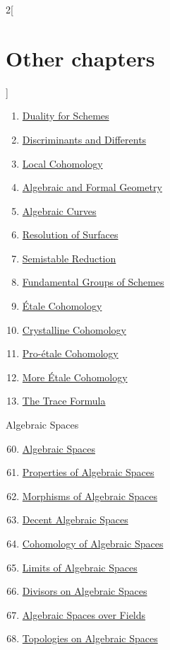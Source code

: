 \begin{multicols}{2}[\section{Other chapters}]
\begin{enumerate}
\item \hyperref[duality-section-phantom]{Duality for Schemes}
\item \hyperref[discriminant-section-phantom]{Discriminants and Differents}
\item \hyperref[local-cohomology-section-phantom]{Local Cohomology}
\item \hyperref[algebraization-section-phantom]{Algebraic and Formal Geometry}
\item \hyperref[curves-section-phantom]{Algebraic Curves}
\item \hyperref[resolve-section-phantom]{Resolution of Surfaces}
\item \hyperref[models-section-phantom]{Semistable Reduction}
\item \hyperref[pione-section-phantom]{Fundamental Groups of Schemes}
\item \hyperref[etale-cohomology-section-phantom]{\'Etale Cohomology}
\item \hyperref[crystalline-section-phantom]{Crystalline Cohomology}
\item \hyperref[proetale-section-phantom]{Pro-\'etale Cohomology}
\item \hyperref[more-etale-section-phantom]{More \'Etale Cohomology}
\item \hyperref[trace-section-phantom]{The Trace Formula}
\end{enumerate}
Algebraic Spaces
\begin{enumerate}
\setcounter{enumi}{59}
\item \hyperref[spaces-section-phantom]{Algebraic Spaces}
\item \hyperref[spaces-properties-section-phantom]{Properties of Algebraic Spaces}
\item \hyperref[spaces-morphisms-section-phantom]{Morphisms of Algebraic Spaces}
\item \hyperref[decent-spaces-section-phantom]{Decent Algebraic Spaces}
\item \hyperref[spaces-cohomology-section-phantom]{Cohomology of Algebraic Spaces}
\item \hyperref[spaces-limits-section-phantom]{Limits of Algebraic Spaces}
\item \hyperref[spaces-divisors-section-phantom]{Divisors on Algebraic Spaces}
\item \hyperref[spaces-over-fields-section-phantom]{Algebraic Spaces over Fields}
\item \hyperref[spaces-topologies-section-phantom]{Topologies on Algebraic Spaces}

\end{enumerate}
\end{multicols}
